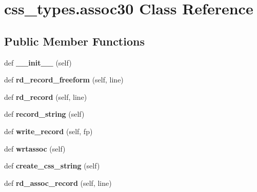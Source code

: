 \hypertarget{classcss__types_1_1assoc30}{}\section{css\+\_\+types.\+assoc30 Class Reference}
\label{classcss__types_1_1assoc30}
\subsection*{Public Member Functions}
\begin{DoxyCompactItemize}
\item 
\hypertarget{classcss__types_1_1assoc30_a634c67da0e957ed5f6ba999bcdbdeb2e}{}def {\bfseries \+\_\+\+\_\+init\+\_\+\+\_\+} (self)\label{classcss__types_1_1assoc30_a634c67da0e957ed5f6ba999bcdbdeb2e}

\item 
\hypertarget{classcss__types_1_1assoc30_aea006de2af3b3512839ec718b67903c2}{}def {\bfseries rd\+\_\+record\+\_\+freeform} (self, line)\label{classcss__types_1_1assoc30_aea006de2af3b3512839ec718b67903c2}

\item 
\hypertarget{classcss__types_1_1assoc30_a308b5166d503708b057e8f128c18c9b3}{}def {\bfseries rd\+\_\+record} (self, line)\label{classcss__types_1_1assoc30_a308b5166d503708b057e8f128c18c9b3}

\item 
\hypertarget{classcss__types_1_1assoc30_a317d809e4f01b40df9c90e3fcff0361c}{}def {\bfseries record\+\_\+string} (self)\label{classcss__types_1_1assoc30_a317d809e4f01b40df9c90e3fcff0361c}

\item 
\hypertarget{classcss__types_1_1assoc30_a6729201374bfd0ec7d6289dac0a9f90f}{}def {\bfseries write\+\_\+record} (self, fp)\label{classcss__types_1_1assoc30_a6729201374bfd0ec7d6289dac0a9f90f}

\item 
\hypertarget{classcss__types_1_1assoc30_a50cf3534c948036a12839613fd87705b}{}def {\bfseries wrtassoc} (self)\label{classcss__types_1_1assoc30_a50cf3534c948036a12839613fd87705b}

\item 
\hypertarget{classcss__types_1_1assoc30_acc41e801d6d420f001dd89d8bd9d105d}{}def {\bfseries create\+\_\+css\+\_\+string} (self)\label{classcss__types_1_1assoc30_acc41e801d6d420f001dd89d8bd9d105d}

\item 
\hypertarget{classcss__types_1_1assoc30_ac9f6988937a1909a61747e3fd7c2a7c5}{}def {\bfseries rd\+\_\+assoc\+\_\+record} (self, line)\label{classcss__types_1_1assoc30_ac9f6988937a1909a61747e3fd7c2a7c5}

\end{DoxyCompactItemize}
